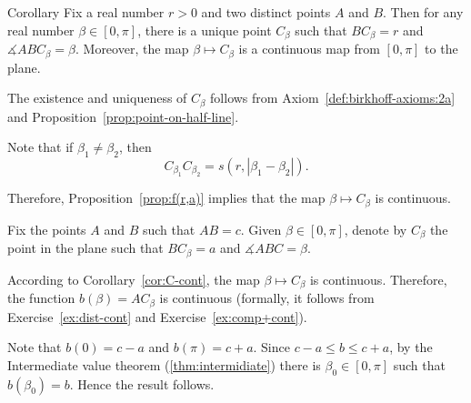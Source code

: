 \begin{thm}{Corollary}\label{cor:C-cont}
Fix a real number $r>0$ 
and two distinct points $A$ and $B$.
Then for 
any real number $\beta\in [0,\pi]$,
there is a unique point $C_\beta$ such that $BC_\beta=r$
and $\measuredangle ABC_\beta=\beta$.
Moreover, the map $\beta\mapsto C_\beta$ 
is a continuous map from $[0,\pi]$ to the plane.
\end{thm}

The existence and uniqueness of $C_\beta$ follows from Axiom~\ref{def:birkhoff-axioms:2a} and Proposition~\ref{prop:point-on-half-line}.

Note that if $\beta_1\ne\beta_2$, then
$$C_{\beta_1}C_{\beta_2}=s(r,|\beta_1-\beta_2|).$$

Therefore, Proposition~\ref{prop:f(r,a)} implies that  the map $\beta\mapsto C_\beta$ is continuous.
\qeds





\label{page:proof:thm:abc}
Fix the points $A$ and $B$ such that $AB=c$.
Given $\beta\in [0,\pi]$,
denote by $C_\beta$ the point in the plane such that $BC_\beta=a$ and $\measuredangle ABC=\beta$.

According to Corollary~\ref{cor:C-cont},
the map
$\beta\mapsto C_\beta$ is continuous.
Therefore, the function $b(\beta)=AC_\beta$ is continuous
(formally, it follows from Exercise~\ref{ex:dist-cont} and Exercise~\ref{ex:comp+cont}).

Note that $b(0)=c-a$ and $b(\pi)=c+a$.
Since $c-a\le b\le c+a$,
by the Intermediate value theorem (\ref{thm:intermidiate})
there is $\beta_0\in[0,\pi]$ such that
$b(\beta_0)=b$.
Hence the result follows. 
\qeds



